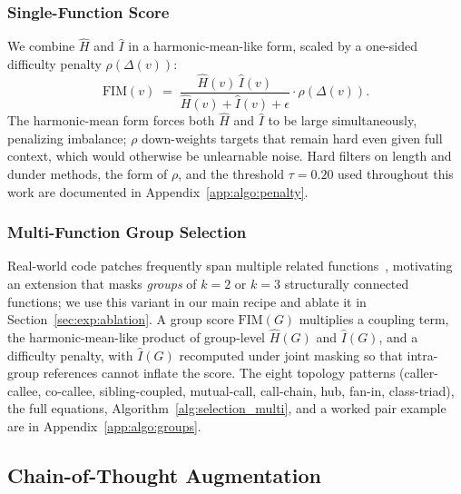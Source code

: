 \subsubsection{Single-Function Score}
\label{sec:method:single}

We combine $\hat{H}$ and $\hat{I}$ in a harmonic-mean-like form, scaled
by a one-sided difficulty penalty $\rho(\Delta(v))$:
\vspace{-0.5ex}
\begin{equation}
  \mathrm{FIM}(v) \;=\;
  \frac{\hat{H}(v)\,\hat{I}(v)}{\hat{H}(v) + \hat{I}(v) + \epsilon}
  \cdot \rho\!\left(\Delta(v)\right).
  \label{eq:fim_single}
\end{equation}
The harmonic-mean form forces both $\hat{H}$ and $\hat{I}$ to be large
simultaneously, penalizing imbalance; $\rho$ down-weights targets that
remain hard even given full context, which would otherwise be
unlearnable noise. Hard filters on length and dunder methods, the form
of $\rho$, and the threshold $\tau\!=\!0.20$ used throughout this work
are documented in Appendix~\ref{app:algo:penalty}.

\subsubsection{Multi-Function Group Selection}
\label{sec:method:groups}

Real-world code patches frequently span multiple related
functions~\citep{swebench}, motivating an extension that masks
\emph{groups} of $k\!=\!2$ or $k\!=\!3$ structurally connected functions;
we use this variant in our main recipe and ablate it in
Section~\ref{sec:exp:ablation}. A group score $\mathrm{FIM}(G)$
multiplies a coupling term, the harmonic-mean-like product of
group-level $\hat{H}(G)$ and $\hat{I}(G)$, and a difficulty penalty,
with $\hat{I}(G)$ recomputed under joint masking so that intra-group
references cannot inflate the score. The eight topology patterns
(caller-callee, co-callee, sibling-coupled, mutual-call, call-chain,
hub, fan-in, class-triad), the full equations,
Algorithm~\ref{alg:selection_multi}, and a worked pair example are in
Appendix~\ref{app:algo:groups}.

\vspace{-0.5ex}
\subsection{Chain-of-Thought Augmentation}
\label{sec:method:cot}


